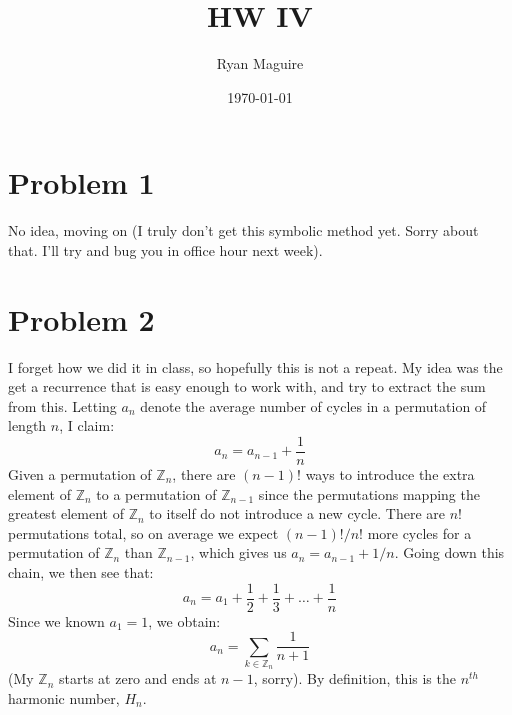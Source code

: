 \documentclass{article}
\title{HW IV}
\author{Ryan Maguire}
\date{\today}
\begin{document}
    \maketitle
    \section*{Problem 1}
        No idea, moving on (I truly don't get this symbolic method yet. Sorry about that.
        I'll try and bug you in office hour next week).
    \section*{Problem 2}
        I forget how we did it in class, so hopefully this is not a repeat.
        My idea was the get a recurrence that is easy enough to work with, and try
        to extract the sum from this. Letting $a_{n}$ denote the average number of
        cycles in a permutation of length $n$, I claim:
        \begin{equation}
            a_{n}=a_{n-1}+\frac{1}{n}
        \end{equation}
        Given a permutation of $\mathbb{Z}_{n}$, there are $(n-1)!$ ways to introduce
        the extra element of $\mathbb{Z}_{n}$ to a permutation of $\mathbb{Z}_{n-1}$
        since the permutations mapping the greatest element of $\mathbb{Z}_{n}$ to
        itself do not introduce a new cycle. There are $n!$ permutations total, so on
        average we expect $(n-1)!/n!$ more cycles for a permutation of $\mathbb{Z}_{n}$
        than $\mathbb{Z}_{n-1}$, which gives us $a_{n}=a_{n-1}+1/n$. Going down this
        chain, we then see that:
        \begin{equation}
            a_{n}=a_{1}+\frac{1}{2}+\frac{1}{3}+\dots+\frac{1}{n}
        \end{equation}
        Since we known $a_{1}=1$, we obtain:
        \begin{equation}
            a_{n}=\sum_{k\in\mathbb{Z}_{n}}\frac{1}{n+1}
        \end{equation}
        (My $\mathbb{Z}_{n}$ starts at zero and ends at $n-1$, sorry). By definition,
        this is the $n^{th}$ harmonic number, $H_{n}$.
\end{document}
